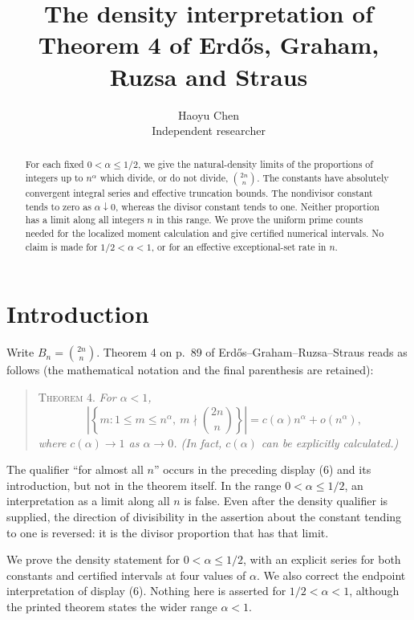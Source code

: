 \documentclass[10pt]{article}
\title{The density interpretation of Theorem 4 of Erd\H{o}s, Graham, Ruzsa and Straus}
\author{Haoyu Chen\\ Independent researcher}
\date{}
\theoremstyle{remark}
\begin{document}
\maketitle

\begin{abstract}
For each fixed $0<\alpha\leq 1/2$, we give the natural-density limits of
the proportions of integers up to $n^\alpha$ which divide, or do not
divide, $\binom{2n}{n}$. The constants have absolutely convergent integral
series and effective truncation bounds. The nondivisor constant tends to
zero as $\alpha\downarrow0$, whereas the divisor constant tends to one.
Neither proportion has a limit along all integers $n$ in this range.
We prove the uniform prime counts needed for the localized moment
calculation and give certified numerical intervals. No claim
is made for $1/2<\alpha<1$, or for an effective exceptional-set rate in $n$.
\end{abstract}

\section{Introduction}
Write $B_n=\binom{2n}{n}$. Theorem 4 on p.~89 of
Erd\H{o}s--Graham--Ruzsa--Straus \cite{EGRS} reads as follows
(the mathematical notation and the final parenthesis are retained):
\begin{quote}
\textsc{Theorem 4.} \textit{For $\alpha<1$,}
\[
 \left|\left\{m:1\leq m\leq n^\alpha,\ m\nmid\binom{2n}{n}\right\}\right|
 =c(\alpha)n^\alpha+o(n^\alpha),
\]
\textit{where $c(\alpha)\to1$ as $\alpha\to0$.
(In fact, $c(\alpha)$ can be explicitly calculated.)}
\end{quote}
The qualifier ``for almost all $n$'' occurs in the preceding display (6)
and its introduction, but not in the theorem itself. In the range
$0<\alpha\leq1/2$, an interpretation as a limit along all $n$ is false.
Even after the density qualifier is supplied, the direction of
divisibility in the assertion about the constant tending to one is
reversed: it is the divisor proportion that has that limit.

We prove the density statement for $0<\alpha\leq1/2$, with an explicit
series for both constants and certified intervals at four values of
$\alpha$. We also correct the endpoint interpretation of display (6).
Nothing here is asserted for $1/2<\alpha<1$, although the printed theorem
states the wider range $\alpha<1$.
\end{document}
